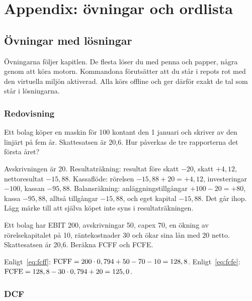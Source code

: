 \section{Appendix: övningar och ordlista}
\label{sec:appendix}

\subsection{Övningar med lösningar}

Övningarna följer kapitlen. De flesta löser du med penna och papper, några genom att köra
motorn. Kommandona förutsätter att du står i repots rot med den virtuella miljön aktiverad.
Alla körs offline och ger därför exakt de tal som står i lösningarna.

\subsubsection*{Redovisning}

\begin{ovning}
Ett bolag köper en maskin för 100\kr{} kontant den 1 januari och skriver av den linjärt på
fem år. Skattesatsen är 20,6\pct. Hur påverkas de tre rapporterna det första året?
\end{ovning}
\begin{losning}
Avskrivningen är 20. Resultaträkning: resultat före skatt $-20$, skatt $+4,12$, nettoresultat
$-15,88$. Kassaflöde: rörelsen $-15,88 + 20 = +4,12$, investeringar $-100$, kassan $-95,88$.
Balansräkning: anläggningstillgångar $+100 - 20 = +80$, kassa $-95,88$, alltså tillgångar
$-15,88$, och eget kapital $-15,88$. Det går ihop. Lägg märke till att själva köpet inte syns
i resultaträkningen.
\end{losning}

\begin{ovning}
Ett bolag har EBIT 200, avskrivningar 50, capex 70, en ökning av rörelsekapitalet på 10,
räntekostnader 30 och ökar sina lån med 20 netto. Skattesatsen är 20,6\pct. Beräkna FCFF och
FCFE.
\end{ovning}
\begin{losning}
Enligt~\eqref{eq:fcff}: $\mathrm{FCFF} = 200 \cdot 0,794 + 50 - 70 - 10 = 128,8$.
Enligt~\eqref{eq:fcfe}: $\mathrm{FCFE} = 128,8 - 30 \cdot 0,794 + 20 = 125,0$.
\end{losning}

\subsubsection*{DCF}

